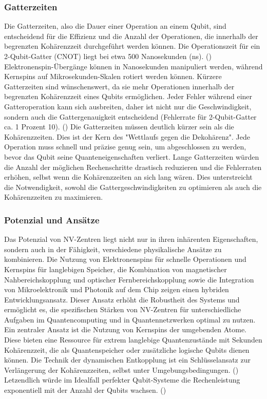 \subsubsection{Gatterzeiten}
Die Gatterzeiten, also die Dauer einer Operation an einem Qubit, sind entscheidend für die Effizienz und die Anzahl der Operationen, die innerhalb der begrenzten Kohärenzzeit durchgeführt werden können.
Die Operationszeit für ein 2-Qubit-Gatter (CNOT) liegt bei etwa 500 Nanosekunden (ns). (\cite{UngeahnteMoglichkeitenDurch}) Elektronenspin-Übergänge können in Nanosekunden manipuliert werden, während Kernspins auf Mikrosekunden-Skalen rotiert werden können. Kürzere Gatterzeiten sind wünschenswert, da sie mehr Operationen innerhalb der begrenzten Kohärenzzeit eines Qubits ermöglichen. Jeder Fehler während einer Gatteroperation kann sich ausbreiten, daher ist nicht nur die Geschwindigkeit, sondern auch die Gattergenauigkeit entscheidend (Fehlerrate für 2-Qubit-Gatter ca. 1 Prozent 10). (\cite{childressDiamondNVCenters2013a})
Die Gatterzeiten müssen deutlich kürzer sein als die Kohärenzzeiten. Dies ist der Kern des "Wettlaufs gegen die Dekohärenz". Jede Operation muss schnell und präzise genug sein, um abgeschlossen zu werden, bevor das Qubit seine Quanteneigenschaften verliert. Lange Gatterzeiten würden die Anzahl der möglichen Rechenschritte drastisch reduzieren und die Fehlerraten erhöhen, selbst wenn die Kohärenzzeiten an sich lang wären. Dies unterstreicht die Notwendigkeit, sowohl die Gattergeschwindigkeiten zu optimieren als auch die Kohärenzzeiten zu maximieren.
\subsubsection{Potenzial und Ansätze}
Das Potenzial von NV-Zentren liegt nicht nur in ihren inhärenten Eigenschaften, sondern auch in der Fähigkeit, verschiedene physikalische Ansätze zu kombinieren. Die Nutzung von Elektronenspins für schnelle Operationen und Kernspins für langlebigen Speicher, die Kombination von magnetischer Nahbereichskopplung und optischer Fernbereichskopplung sowie die Integration von Mikroelektronik und Photonik auf dem Chip zeigen einen hybriden Entwicklungsansatz. Dieser Ansatz erhöht die Robustheit des Systems und ermöglicht es, die spezifischen Stärken von NV-Zentren für unterschiedliche Aufgaben im Quantencomputing und in Quantennetzwerken optimal zu nutzen. 
Ein zentraler Ansatz ist die Nutzung von Kernspins der umgebenden Atome. Diese bieten eine Ressource für extrem langlebige Quantenzustände mit Sekunden Kohärenzzeit, die als Quantenspeicher oder zusätzliche logische Qubits dienen können. Die Technik der dynamischen Entkopplung ist ein Schlüsselansatz zur Verlängerung der Kohärenzzeiten, selbst unter Umgebungsbedingungen. (\cite{childressDiamondNVCenters2013a})
Letzendlich würde im Idealfall perfekter Qubit-Systeme die Rechenleistung exponentiell mit der Anzahl der Qubits wachsen. (\cite{UngeahnteMoglichkeitenDurch}) 


